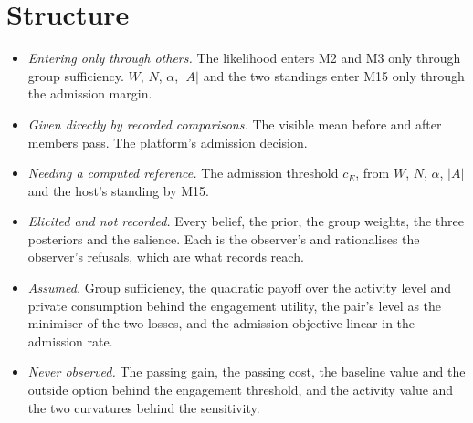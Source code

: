 \documentclass[11pt]{article}
\begin{document}
\section*{Structure}

\begin{itemize}
\item \emph{Entering only through others.} The likelihood enters M2 and M3
  only through group sufficiency. $W$, $N$, $\alpha$, $|A|$ and the two
  standings enter M15 only through the admission margin.
\item \emph{Given directly by recorded comparisons.} The visible mean before
  and after members pass. The platform's admission decision.
\item \emph{Needing a computed reference.} The admission threshold $c_E$,
  from $W$, $N$, $\alpha$, $|A|$ and the host's standing by M15.
\item \emph{Elicited and not recorded.} Every belief, the prior, the group
  weights, the three posteriors and the salience. Each is the observer's and
  rationalises the observer's refusals, which are what records reach.
\item \emph{Assumed.} Group sufficiency, the quadratic payoff over the
  activity level and private consumption behind the engagement utility, the
  pair's level as the minimiser of the two losses, and the admission
  objective linear in the admission rate.
\item \emph{Never observed.} The passing gain, the passing cost, the
  baseline value and the outside option behind the engagement threshold,
  and the activity value and the two curvatures behind the sensitivity.
\end{itemize}
\end{document}
